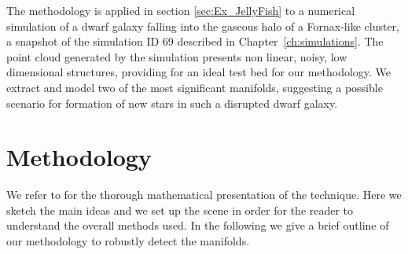 
The methodology is applied in section \ref{sec:Ex_JellyFish} to a numerical simulation of a dwarf galaxy falling into the gaseous halo of a Fornax-like cluster, a snapshot of the simulation ID 69 described in Chapter~\ref{ch:simulations}.
{The point cloud generated by the simulation presents non linear, noisy, low dimensional structures,
providing for an ideal test bed for our methodology.}
We extract and model two of the most significant manifolds, suggesting a possible scenario for formation of new stars in such a disrupted dwarf galaxy.

\section{Methodology} \label{sec:Methodology}
We refer to \citet{Canducci2021} for the thorough mathematical presentation of the technique.
Here we sketch the main ideas and we set up the scene in order for the reader to understand the overall methods used.
In the following we give a brief outline of our methodology to robustly detect the manifolds.

